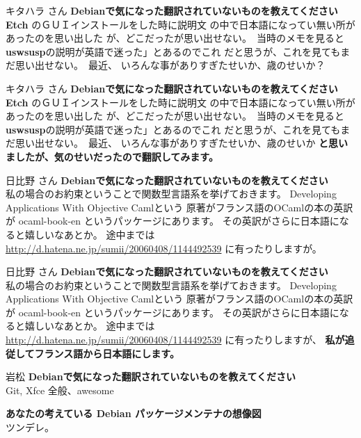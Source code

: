\documentclass[cjk,dvipdfmx,12pt]{beamer}
\begin{document}
\begin{frame}{キタハラ さん}
\textbf{Debianで気になった翻訳されていないものを教えてください}\\
{\bf Etch} のＧＵＩインストールをした時に説明文
の中で日本語になってい無い所があったのを思い出した
が、どこだったが思い出せない。　当時のメモを見ると
{\bf uswsusp}の説明が英語で迷った」とあるのでこれ
だと思うが、これを見てもまだ思い出せない。　最近、
いろんな事がありすぎたせいか、歳のせいか？
\end{frame}

\begin{frame}{キタハラ さん}
\textbf{Debianで気になった翻訳されていないものを教えてください}\\
{\bf Etch} のＧＵＩインストールをした時に説明文
の中で日本語になってい無い所があったのを思い出した
が、どこだったが思い出せない。　当時のメモを見ると
{\bf uswsusp}の説明が英語で迷った」とあるのでこれ
だと思うが、これを見てもまだ思い出せない。　最近、
いろんな事がありすぎたせいか、歳のせいか
\textbf{と思いましたが、気のせいだったので翻訳してみます。}
\end{frame}


\begin{frame}{日比野 さん}
\textbf{Debianで気になった翻訳されていないものを教えてください}\\

私の場合のお約束ということで関数型言語系を挙げておきます。
Developing Applications With Objective Camlという
原著がフランス語のOCamlの本の英訳が ocaml-book-en というパッケージにあります。
その英訳がさらに日本語になると嬉しいなあとか。
途中までは \url{http://d.hatena.ne.jp/sumii/20060408/1144492539} に有ったりしますが。
\end{frame}


\begin{frame}{日比野 さん}
\textbf{Debianで気になった翻訳されていないものを教えてください}\\

私の場合のお約束ということで関数型言語系を挙げておきます。
Developing Applications With Objective Camlという
原著がフランス語のOCamlの本の英訳が ocaml-book-en というパッケージにあります。
その英訳がさらに日本語になると嬉しいなあとか。
途中までは \url{http://d.hatena.ne.jp/sumii/20060408/1144492539} に有ったりしますが、
\textbf{私が追従してフランス語から日本語にします。}
\end{frame}

\begin{frame}{岩松}
\textbf{Debianで気になった翻訳されていないものを教えてください}\\
Git, Xfce 全般、awesome

\textbf{あなたの考えている Debian パッケージメンテナの想像図}\\
ツンデレ。
\end{frame}
\end{document}
